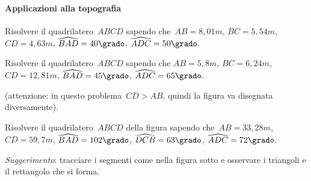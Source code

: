 \paragraph{Applicazioni alla topografia}

\begin{multicols}{2}
 \begin{esercizio}
\label{ese:G.34}
Risolvere il quadrilatero~$ABCD$ sapendo che~${AB}=8,01\unit{m}$,
${BC}=5,54\unit{m}$, ${CD}=4,63\unit{m}$, $\widehat{BAD}=40\grado$, $\widehat{ADC}=50\grado$.
\end{esercizio}

\begin{esercizio}
\label{ese:G.35}
Risolvere il quadrilatero~$ABCD$ sapendo che ${AB}=5,8\unit{m}$, ${BC}=6,24\unit{m}$,
${CD}=12,81\unit{m}$, $\widehat{BAD}=45\grado$, $\widehat{ADC}=65\grado$.

(attenzione: in questo problema~${CD}>{AB}$, quindi la figura va disegnata diversamente).
\end{esercizio}

 \begin{esercizio}
\label{ese:G.36}
Risolvere il quadrilatero~$ABCD$ della figura sapendo che~${AB}=33,28\unit{m}$, ${CD}=59,7\unit{m}$,
$\widehat{BAD}=102\grado$, $\widehat{DCB}=63\grado$, $\widehat{ADC}=72\grado$.

\emph{Suggerimento}: tracciare i segmenti come nella figura sotto e osservare i triangoli e il rettangolo che si forma.
\end{esercizio}
\begin{center}
 
\end{center}
\end{multicols}

\pagebreak

